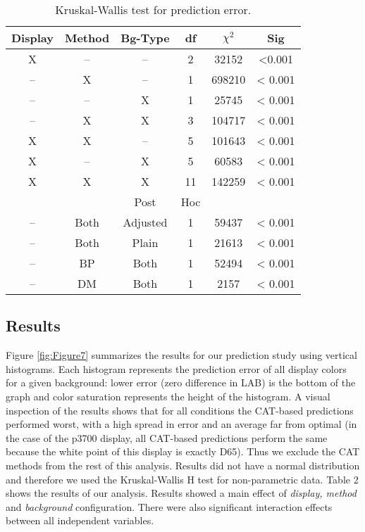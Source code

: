 \documentclass[annual]{acmsiggraph}
\begin{document}
\begin{table}[ht]
\caption{Kruskal-Wallis test for prediction error.} %
\centering %
\begin{tabular}{c c c c c c} %
\hline
\hline
 Display & Method & Bg-Type & df & $\chi^2$ & Sig \\   %
\hline\hline  %
X&--&--&2&32152&<0.001\\
--&X&--&1&698210&< 0.001\\
--&--&X&1&25745&< 0.001\\
--&X&X&3&104717&< 0.001\\
X&X&--&5&101643&< 0.001\\
X&--&X&5&60583&< 0.001\\
X&X&X&11&142259&< 0.001\\
\hline %
&&Post&Hoc&\\
\hline
--&Both&Adjusted&1&59437&< 0.001\\
--&Both&Plain&1&21613&< 0.001\\
--&BP&Both&1&52494&< 0.001\\
--&DM&Both&1&2157&< 0.001\\
\hline
\end{tabular}
\label{table:2} %
\end{table}

\subsection{Results}
Figure \ref{fig:Figure7} summarizes the results for our prediction study using vertical histograms. Each histogram represents the prediction error of all display colors for a given background: lower error (zero difference in LAB) is the bottom of the graph and color saturation represents the height of the histogram. A visual inspection of the results shows that for all conditions the CAT-based predictions performed worst, with a high spread in error and an average far from optimal (in the case of the p3700 display, all CAT-based predictions perform the same because the white point of this display is exactly D65). Thus we exclude the CAT methods from the rest of this analysis. Results did not have a normal distribution and therefore we used the Kruskal-Wallis H test for non-parametric data. Table 2 shows the results of our analysis. Results showed a main effect of \textit{display, method} and \textit{background} configuration. There were also significant interaction effects between all independent variables.
\end{document}
